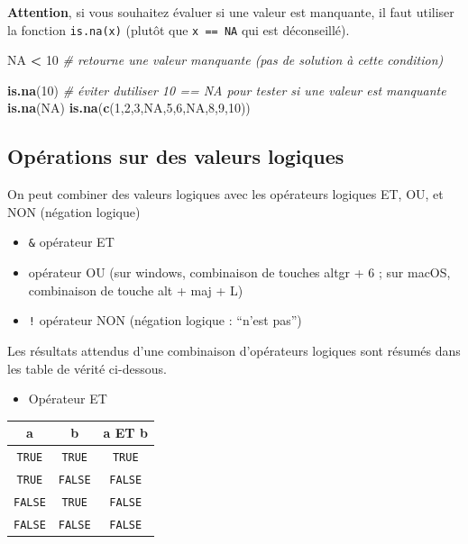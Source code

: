 \documentclass[
]{book}
\newenvironment{Shaded}{\begin{snugshade}}{\end{snugshade}}
\newcommand{\CommentTok}[1]{\textcolor[rgb]{0.56,0.35,0.01}{\textit{#1}}}
\newcommand{\ConstantTok}[1]{\textcolor[rgb]{0.56,0.35,0.01}{#1}}
\newcommand{\DecValTok}[1]{\textcolor[rgb]{0.00,0.00,0.81}{#1}}
\newcommand{\FunctionTok}[1]{\textcolor[rgb]{0.13,0.29,0.53}{\textbf{#1}}}
\newcommand{\NormalTok}[1]{#1}
\newcommand{\SpecialCharTok}[1]{\textcolor[rgb]{0.81,0.36,0.00}{\textbf{#1}}}
\newcounter{none} %
\providecommand{\tightlist}{%
  \setlength{\itemsep}{0pt}\setlength{\parskip}{0pt}}
\begin{document}
\textbf{Attention}, si vous souhaitez évaluer si une valeur est manquante, il faut utiliser la fonction \texttt{is.na(x)} (plutôt que \texttt{x\ ==\ NA} qui est déconseillé).

\begin{Shaded}
\begin{Highlighting}[]
\ConstantTok{NA} \SpecialCharTok{\textless{}} \DecValTok{10} \CommentTok{\# retourne une valeur manquante (pas de solution à cette condition)}

\FunctionTok{is.na}\NormalTok{(}\DecValTok{10}\NormalTok{) }\CommentTok{\# éviter d\textquotesingle{}utiliser 10 == NA pour tester si une valeur est manquante}
\FunctionTok{is.na}\NormalTok{(}\ConstantTok{NA}\NormalTok{)}
\FunctionTok{is.na}\NormalTok{(}\FunctionTok{c}\NormalTok{(}\DecValTok{1}\NormalTok{,}\DecValTok{2}\NormalTok{,}\DecValTok{3}\NormalTok{,}\ConstantTok{NA}\NormalTok{,}\DecValTok{5}\NormalTok{,}\DecValTok{6}\NormalTok{,}\ConstantTok{NA}\NormalTok{,}\DecValTok{8}\NormalTok{,}\DecValTok{9}\NormalTok{,}\DecValTok{10}\NormalTok{))}
\end{Highlighting}
\end{Shaded}

\subsection{Opérations sur des valeurs logiques}\label{opuxe9rations-sur-des-valeurs-logiques}

On peut combiner des valeurs logiques avec les opérateurs logiques ET, OU, et NON (négation logique)

\begin{itemize}
\tightlist
\item
  \texttt{\&} opérateur ET
\item
  \texttt{\textbar{}} opérateur OU (sur windows, combinaison de touches altgr + 6 ; sur macOS, combinaison de touche alt + maj + L)
\item
  \texttt{!} opérateur NON (négation logique : ``n'est pas'')
\end{itemize}

Les résultats attendus d'une combinaison d'opérateurs logiques sont résumés dans les table de vérité ci-dessous.

\begin{itemize}
\tightlist
\item
  Opérateur ET
\end{itemize}

{\def\LTcaptype{none} %
\begin{longtable}[]{@{}ccc@{}}
\toprule\noalign{}
a & b & a ET b \\
\midrule\noalign{}
\endhead
\bottomrule\noalign{}
\endlastfoot
\texttt{TRUE} & \texttt{TRUE} & \texttt{TRUE} \\
\texttt{TRUE} & \texttt{FALSE} & \texttt{FALSE} \\
\texttt{FALSE} & \texttt{TRUE} & \texttt{FALSE} \\
\texttt{FALSE} & \texttt{FALSE} & \texttt{FALSE} \\
\end{longtable}
}
\end{document}
